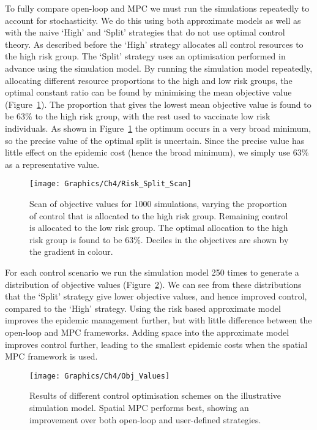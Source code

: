 To fully compare open-loop and MPC we must run the simulations repeatedly to account for stochasticity. We do this using both approximate models as well as with the naive `High' and `Split' strategies that do not use optimal control theory. As described before the `High' strategy allocates all control resources to the high risk group. The `Split' strategy uses an optimisation performed in advance using the simulation model. By running the simulation model repeatedly, allocating different resource proportions to the high and low risk groups, the optimal constant ratio can be found by minimising the mean objective value (Figure~\ref{fig:ch4:risk_split_scan}). The proportion that gives the lowest mean objective value is found to be 63\% to the high risk group, with the rest used to vaccinate low risk individuals. As shown in Figure~\ref{fig:ch4:risk_split_scan} the optimum occurs in a very broad minimum, so the precise value of the optimal split is uncertain. Since the precise value has little effect on the epidemic cost (hence the broad minimum), we simply use 63\% as a representative value.

\begin{figure}[h]
    \begin{center}
        \texttt{[image: Graphics/Ch4/Risk\_Split\_Scan]}
        \caption{Scan of objective values for 1000 simulations, varying the proportion of control that is allocated to the high risk group. Remaining control is allocated to the low risk group. The optimal allocation to the high risk group is found to be 63\%. Deciles in the objectives are shown by the gradient in colour.}
        \label{fig:ch4:risk_split_scan}
    \end{center}
\end{figure}

For each control scenario we run the simulation model 250 times to generate a distribution of objective values (Figure~\ref{fig:ch4:obj_values}). We can see from these distributions that the `Split' strategy give lower objective values, and hence improved control, compared to the `High' strategy. Using the risk based approximate model improves the epidemic management further, but with little difference between the open-loop and MPC frameworks. Adding space into the approximate model improves control further, leading to the smallest epidemic costs when the spatial MPC framework is used.

\begin{figure}[h]
    \begin{center}
        \texttt{[image: Graphics/Ch4/Obj\_Values]}
        \caption{Results of different control optimisation schemes on the illustrative simulation model. Spatial MPC performs best, showing an improvement over both open-loop and user-defined strategies.}
        \label{fig:ch4:obj_values}
    \end{center}
\end{figure}

